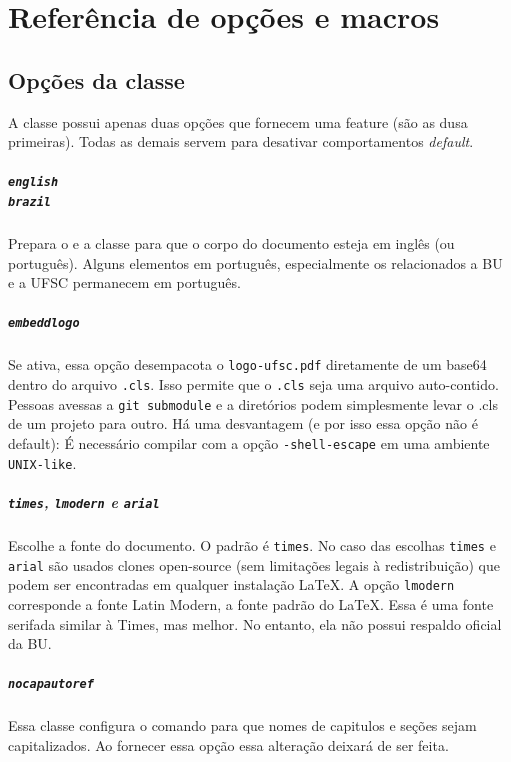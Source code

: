 \documentclass[embeddedlogo]{../ufsc-thesis-rn46-2019}
\begin{document}
\chapter{Referência de opções e macros}
\label{ch:ref}

\section{Opções da classe}

A classe possui apenas duas opções que fornecem uma feature (são as dusa primeiras). Todas as demais servem para desativar comportamentos \textit{default}.

\paragraph*{\texttt{english} \\
            \texttt{brazil}}
Prepara o \abnTeX e a classe para que o corpo do documento esteja em inglês (ou português). Alguns elementos em português, especialmente os relacionados a BU e a UFSC permanecem em português.

\paragraph*{\texttt{embeddlogo}} Se ativa, essa opção desempacota o \texttt{logo-ufsc.pdf} diretamente de um base64 dentro do arquivo \texttt{.cls}. Isso permite que o \texttt{.cls} seja uma arquivo auto-contido. Pessoas avessas a \texttt{git submodule} e a diretórios podem simplesmente levar o .cls de um projeto para outro. Há uma desvantagem (e por isso essa opção não é default): É necessário compilar com a opção \texttt{-shell-escape} em uma ambiente \texttt{UNIX-like}.

\paragraph*{\texttt{times}, \texttt{lmodern} e \texttt{arial}} Escolhe a fonte do documento. O padrão é \texttt{times}. No caso das escolhas \texttt{times} e \texttt{arial} são usados clones open-source (sem limitações legais à redistribuição) que podem ser encontradas em qualquer instalação \LaTeX. A opção \texttt{lmodern} corresponde a fonte Latin Modern, a fonte padrão do \LaTeX. Essa é uma fonte serifada similar à Times, mas melhor. No entanto, ela não possui respaldo oficial da BU.

\paragraph*{\texttt{nocapautoref}} Essa classe configura o comando \mt{\autoref} para que nomes de capitulos e seções sejam capitalizados. Ao fornecer essa opção essa alteração deixará de ser feita.
\end{document}
